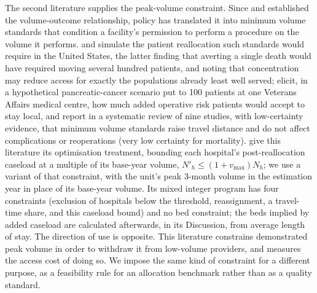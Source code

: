 The second literature supplies the peak-volume constraint. Since
\citet{luft1979} and \citet{luft1987} established the volume-outcome
relationship, policy has translated it into minimum volume standards that
condition a facility's permission to perform a procedure on the volume it
performs. \citet{dudley2000} and \citet{epstein2005} simulate the patient
reallocation such standards would require in the United States, the latter
finding that averting a single death would have required moving several hundred
patients, and noting that concentration may reduce access for exactly the
populations already least well served; \citet{finlayson1999} elicit, in a hypothetical pancreatic-cancer scenario put to 100 patients at one Veterans Affairs
medical centre, how much added operative risk patients would accept to stay local, and \citet{scharfe2025} report in a
systematic review of nine studies, with low-certainty evidence, that minimum volume standards raise travel distance and
do not affect complications or reoperations (very low certainty for mortality). \citet{vogel2022} give this literature
its optimisation treatment, bounding each hospital's post-reallocation caseload
at a multiple of its base-year volume, $N'_h \leq (1+v_{\max})N_h$; we use a variant of that constraint, with the unit's peak 3-month volume in the estimation year in place of its base-year volume. Its mixed
integer program has four constraints (exclusion of hospitals below the threshold, reassignment, a travel-time share, and this
caseload bound) and no bed constraint; the beds implied by added caseload are calculated afterwards, in its Discussion, from
average length of stay.
The direction of use is opposite. This literature constrains demonstrated
peak volume in order to withdraw it from low-volume providers, and measures the
access cost of doing so. We impose the same kind of constraint for a different purpose, as a
feasibility rule for an allocation benchmark rather than as a quality standard.

